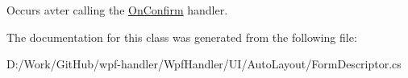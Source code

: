 Occurs avter calling the \mbox{\hyperlink{class_wpf_handler_1_1_u_i_1_1_auto_layout_1_1_form_descriptor_ae2d4791e3085dba435c09b6082bd8408}{On\+Confirm}} handler. 



The documentation for this class was generated from the following file\+:\begin{DoxyCompactItemize}
\item 
D\+:/\+Work/\+Git\+Hub/wpf-\/handler/\+Wpf\+Handler/\+U\+I/\+Auto\+Layout/Form\+Descriptor.\+cs\end{DoxyCompactItemize}
